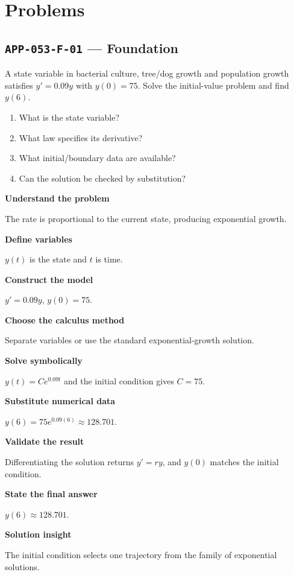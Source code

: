 \documentclass[11pt]{book}
\newcommand{\pid}[1]{\texttt{#1}}
\begin{document}
\section*{Problems}
\subsection*{\pid{APP-053-F-01} — Foundation}
\begin{problembox}
A state variable in bacterial culture, tree/dog growth and population growth satisfies $y'=0.09y$ with $y(0)=75$. Solve the initial-value problem and find $y(6)$.
\end{problembox}
\begin{promptbox}\begin{enumerate}
\item What is the state variable?
\item What law specifies its derivative?
\item What initial/boundary data are available?
\item Can the solution be checked by substitution?
\end{enumerate}\end{promptbox}
\begin{solutionbox}
\textbf{Understand the problem}\par The rate is proportional to the current state, producing exponential growth.\par\medskip
\textbf{Define variables}\par $y(t)$ is the state and $t$ is time.\par\medskip
\textbf{Construct the model}\par $y'=0.09y$, $y(0)=75$.\par\medskip
\textbf{Choose the calculus method}\par Separate variables or use the standard exponential-growth solution.\par\medskip
\textbf{Solve symbolically}\par $y(t)=Ce^{0.09t}$ and the initial condition gives $C=75$.\par\medskip
\textbf{Substitute numerical data}\par $y(6)=75e^{0.09(6)}\approx 128.701$.\par\medskip
\textbf{Validate the result}\par Differentiating the solution returns $y'=ry$, and $y(0)$ matches the initial condition.\par\medskip
\textbf{State the final answer}\par $y(6)\approx 128.701$.\par\medskip
\textbf{Solution insight}\par The initial condition selects one trajectory from the family of exponential solutions.\par\medskip
\end{solutionbox}
\end{document}
